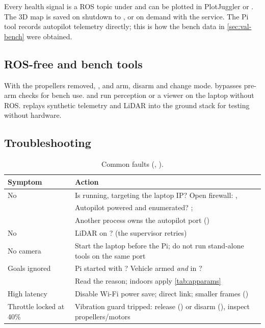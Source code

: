 Every health signal is a ROS topic under  and can be plotted in
PlotJuggler or . The 3D map is saved on shutdown to
, or on demand with the  service.
The Pi tool  records autopilot telemetry
directly; this is how the bench data in \cref{sec:val-bench} were obtained.

\subsection{ROS-free and bench tools}

With the propellers removed, ,  and
 arm, disarm and change mode. 
bypasses pre-arm checks for bench use.  and
 run perception or a viewer on the laptop without ROS.
 replays synthetic telemetry and LiDAR into the ground stack for
testing without hardware.

\subsection{Troubleshooting}

\begin{table}[H]
\centering\small
\caption{Common faults (, ).}
\label{tab:troubleshoot}
\begin{tabularx}{\textwidth}{p{4.3cm} L}
\toprule
\textbf{Symptom} & \textbf{Action} \\
\midrule
No  & Is  running, targeting the laptop IP? Open firewall: ,  \\
 & Autopilot powered and enumerated? ;  \\
 & Another process owns the autopilot port () \\
No  & LiDAR on ? (the supervisor retries) \\
No camera & Start the laptop before the Pi; do not run stand-alone tools on the same port \\
Goals ignored & Pi started with ? Vehicle armed \emph{and} in ? \\
 & Read the reason; indoors apply \cref{tab:apparams} \\
High latency & Disable Wi-Fi power save; direct link; smaller frames () \\
Throttle locked at 40\% & Vibration guard tripped: release () or disarm (), inspect propellers/motors \\
\bottomrule
\end{tabularx}
\end{table}

